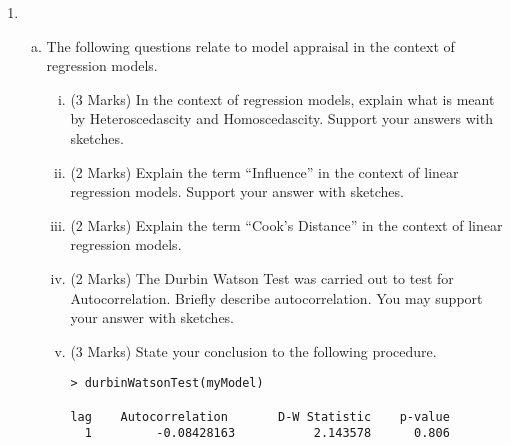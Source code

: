\documentclass[a4paper,12pt]{article}
\begin{document}
\begin{enumerate}
\begin{enumerate}[(a)]
\end{enumerate}

\item 
\begin{enumerate}[(a)]
\item The following questions relate to model appraisal in the context of regression models.
%
\begin{enumerate}[(i)]

\item (3 Marks) In the context of regression models, explain what is meant by Heteroscedascity and Homoscedascity. Support your answers with sketches.
\item (2 Marks) Explain the term “Influence” in the context of linear regression models. Support your
answer with sketches.
\item (2 Marks) Explain the term “Cook’s Distance” in the context of linear regression models.
\item (2 Marks) The Durbin Watson Test was carried out to test for Autocorrelation. Briefly describe
autocorrelation. You may support your answer with sketches.
\item (3 Marks) State your conclusion to the following procedure.
\begin{framed}
\begin{verbatim}
> durbinWatsonTest(myModel)

lag    Autocorrelation       D-W Statistic    p-value
  1         -0.08428163           2.143578      0.806


\end{verbatim}
\end{framed}
\end{enumerate}
\end{enumerate}
\end{enumerate}
\end{document}
